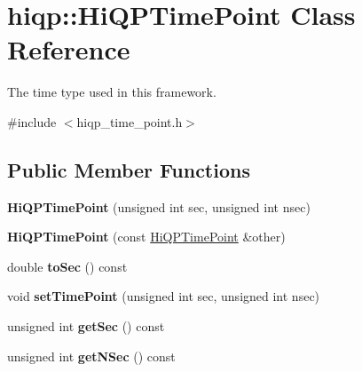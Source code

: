 \hypertarget{classhiqp_1_1HiQPTimePoint}{\section{hiqp\-:\-:Hi\-Q\-P\-Time\-Point Class Reference}
\label{classhiqp_1_1HiQPTimePoint}
}


The time type used in this framework.  




{\ttfamily \#include $<$hiqp\-\_\-time\-\_\-point.\-h$>$}

\subsection*{Public Member Functions}
\begin{DoxyCompactItemize}
\item 
\hypertarget{classhiqp_1_1HiQPTimePoint_ab782a12e0231f8690f1a1612734fa3a0}{{\bfseries Hi\-Q\-P\-Time\-Point} (unsigned int sec, unsigned int nsec)}\label{classhiqp_1_1HiQPTimePoint_ab782a12e0231f8690f1a1612734fa3a0}

\item 
\hypertarget{classhiqp_1_1HiQPTimePoint_a3746cfbcd908511d1cb90ebdde298449}{{\bfseries Hi\-Q\-P\-Time\-Point} (const \hyperlink{classhiqp_1_1HiQPTimePoint}{Hi\-Q\-P\-Time\-Point} \&other)}\label{classhiqp_1_1HiQPTimePoint_a3746cfbcd908511d1cb90ebdde298449}

\item 
\hypertarget{classhiqp_1_1HiQPTimePoint_a8483fab99bc1165128e5e7da7274368e}{double {\bfseries to\-Sec} () const }\label{classhiqp_1_1HiQPTimePoint_a8483fab99bc1165128e5e7da7274368e}

\item 
\hypertarget{classhiqp_1_1HiQPTimePoint_a1e2b0f0cbede66fdcff58a9accaaabf0}{void {\bfseries set\-Time\-Point} (unsigned int sec, unsigned int nsec)}\label{classhiqp_1_1HiQPTimePoint_a1e2b0f0cbede66fdcff58a9accaaabf0}

\item 
\hypertarget{classhiqp_1_1HiQPTimePoint_a3d8648ce24428c49e3fa5c9fd3e21c54}{unsigned int {\bfseries get\-Sec} () const }\label{classhiqp_1_1HiQPTimePoint_a3d8648ce24428c49e3fa5c9fd3e21c54}

\item 
\hypertarget{classhiqp_1_1HiQPTimePoint_a6505f34b808f1a1a8c0a5eea65d0f10e}{unsigned int {\bfseries get\-N\-Sec} () const }\label{classhiqp_1_1HiQPTimePoint_a6505f34b808f1a1a8c0a5eea65d0f10e}


\end{DoxyCompactItemize}
